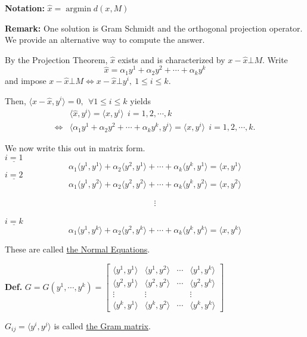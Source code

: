 \documentclass[letterpaper]{article}
\begin{document}
\noindent \textbf{Notation:} $\hat{x} = \operatorname*{argmin}d(x,M)$

\noindent \textbf{Remark:} One solution is Gram Schmidt and the orthogonal projection operator.
We provide an alternative way to compute the answer.

By the Projection Theorem, $\hat{x} $ exists and is characterized by $x-\hat{x} \bot M$.
Write
$$\hat{x}= \alpha_1 y^1+ \alpha_2 y^2+ \cdots +\alpha_k y^k$$
and impose $x-\hat{x} \bot M \Leftrightarrow x-\hat{x} \bot y^i,~ 1 \le i \le k$.

Then, $ \langle x-\hat{x},y^i \rangle =0,~~\forall 1 \leq i \leq k$ yields
\begin{align*}
&\langle \hat{x},y^i \rangle = \langle x,y^i \rangle     ~~  i=1,2,\cdots, k \\
\Leftrightarrow&\langle \alpha_1 y^1+ \alpha_2 y^2+\cdots +\alpha_k y^k, y^i \rangle  =  \langle x,y^i \rangle      ~~   i=1,2,\cdots ,k.
\end{align*}

We now write this out in matrix form.\\
$\underline{i=1}$
$$\alpha_1  \langle y^1,y^1 \rangle +\alpha_2  \langle y^2,y^1 \rangle + \cdots + \alpha_k  \langle y^k,y^1 \rangle =  \langle x,y^1 \rangle $$
$\underline{i=2}$
$$\alpha_1  \langle y^1,y^2 \rangle +\alpha_2  \langle y^2,y^2 \rangle + \cdots + \alpha_k  \langle y^k,y^2 \rangle =  \langle x,y^2 \rangle $$ \\
$$\vdots$$\\
$\underline{i=k}$
$$\alpha_1  \langle y^1,y^k \rangle +\alpha_2  \langle y^2,y^k \rangle + \cdots + \alpha_k  \langle y^k,y^k \rangle =  \langle x,y^k \rangle $$

\noindent These are called \underline{the Normal Equations}.

\noindent \textbf{Def.}
$G=G(y^1,\cdots , y^k)=\left[ \begin{array}{cccc}  \langle y^1,y^1 \rangle  &  \langle y^1,y^2 \rangle  & \cdots &  \langle y^1,y^k \rangle  \\  \langle y^2,y^1 \rangle  &  \langle y^2,y^2 \rangle  & \cdots &  \langle y^2,y^k \rangle \\ \vdots & \vdots && \vdots \\  \langle y^k,y^1 \rangle  &  \langle y^k,y^2 \rangle  & \cdots &  \langle y^k,y^k \rangle  \end{array}  \right]$

$G_{ij}= \langle y^i,y^j \rangle $ is called \underline{the Gram matrix}.\\
\end{document}
